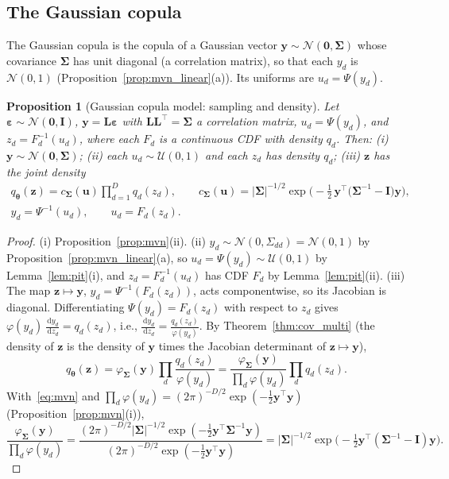 \documentclass[11pt,a4paper]{article}
\numberwithin{equation}{section}
\theoremstyle{plain}
\newtheorem{proposition}{Proposition}[section]
\theoremstyle{definition}
\theoremstyle{remark}
\newcommand{\z}{\mathbf{z}}
\newcommand{\y}{\mathbf{y}}
\newcommand{\uu}{\mathbf{u}}
\newcommand{\eps}{\bm{\varepsilon}}
\newcommand{\Sig}{\bm{\Sigma}}
\newcommand{\Lb}{\mathbf{L}}
\newcommand{\I}{\mathbf{I}}
\newcommand{\N}{\mathcal{N}}
\newcommand{\U}{\mathcal{U}}
\newcommand{\dd}{\,\mathrm{d}}
\newcommand{\qth}{q_{\bm{\theta}}}
\begin{document}
\subsection{The Gaussian copula}
The Gaussian copula is the copula of a Gaussian vector $\y\sim\N(\mathbf0,\Sig)$ whose covariance $\Sig$ has unit diagonal (a correlation matrix), so that each $y_d$ is $\N(0,1)$ (Proposition~\ref{prop:mvn_linear}(a)). Its uniforms are $u_d=\Psi(y_d)$.

\begin{proposition}[Gaussian copula model: sampling and density]
\label{prop:copula_sampling}
Let $\eps\sim\N(\mathbf0,\I)$, $\y=\Lb\eps$ with $\Lb\Lb^\top=\Sig$ a correlation matrix, $u_d=\Psi(y_d)$, and $z_d=F_d^{-1}(u_d)$, where each $F_d$ is a continuous CDF with density $q_d$. Then:
(i) $\y\sim\N(\mathbf0,\Sig)$; (ii) each $u_d\sim\U(0,1)$ and each $z_d$ has density $q_d$; (iii) $\z$ has the joint density
\begin{equation}
\begin{gathered}
\qth(\z)=c_{\Sig}(\uu)\prod_{d=1}^Dq_d(z_d),\qquad
c_{\Sig}(\uu)=|\Sig|^{-1/2}\exp\Big(-\tfrac12\,\y^\top\big(\Sig^{-1}-\I\big)\y\Big),\\
y_d=\Psi^{-1}(u_d),\qquad u_d=F_d(z_d).
\end{gathered}
\label{eq:gauss_copula_density}
\end{equation}
\end{proposition}
\begin{proof}
(i) Proposition~\ref{prop:mvn}(ii).
(ii) $y_d\sim\N(0,\Sigma_{dd})=\N(0,1)$ by Proposition~\ref{prop:mvn_linear}(a), so $u_d=\Psi(y_d)\sim\U(0,1)$ by Lemma~\ref{lem:pit}(i), and $z_d=F_d^{-1}(u_d)$ has CDF $F_d$ by Lemma~\ref{lem:pit}(ii).
(iii) The map $\z\mapsto\y$, $y_d=\Psi^{-1}(F_d(z_d))$, acts componentwise, so its Jacobian is diagonal. Differentiating $\Psi(y_d)=F_d(z_d)$ with respect to $z_d$ gives $\varphi(y_d)\,\frac{\dd y_d}{\dd z_d}=q_d(z_d)$, i.e., $\frac{\dd y_d}{\dd z_d}=\frac{q_d(z_d)}{\varphi(y_d)}$. By Theorem~\ref{thm:cov_multi} (the density of $\z$ is the density of $\y$ times the Jacobian determinant of $\z\mapsto\y$),
\begin{equation*}
\qth(\z)=\varphi_{\Sig}(\y)\prod_d\frac{q_d(z_d)}{\varphi(y_d)}=\frac{\varphi_{\Sig}(\y)}{\prod_d\varphi(y_d)}\prod_dq_d(z_d).
\end{equation*}
With~\eqref{eq:mvn} and $\prod_d\varphi(y_d)=(2\pi)^{-D/2}\exp(-\tfrac12\y^\top\y)$ (Proposition~\ref{prop:mvn}(i)),
\begin{equation*}
\frac{\varphi_{\Sig}(\y)}{\prod_d\varphi(y_d)}=\frac{(2\pi)^{-D/2}|\Sig|^{-1/2}\exp(-\tfrac12\y^\top\Sig^{-1}\y)}{(2\pi)^{-D/2}\exp(-\tfrac12\y^\top\y)}=|\Sig|^{-1/2}\exp\Big(-\tfrac12\y^\top(\Sig^{-1}-\I)\y\Big).
\end{equation*}
\end{proof}
\end{document}
